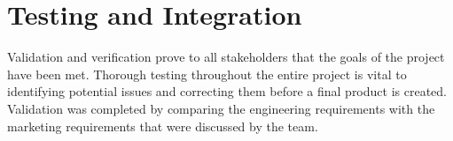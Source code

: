 \newcommand{\testheader}{\textrotate{\textbf{Step}} & \textbf{Action} & \textbf{Expected Result} & \textrotate{\textbf{Pass}} & \textrotate{\textbf{Fail}} & \textrotate{\textbf{N/A}} & \textbf{Comments} \\ \hline}
\newcommand{\testinfo}[2]{\multicolumn{2}{|r|}{\textbf{Test Case Name:}} & \multicolumn{5}{m{11cm}|}{#1} \\ \hline \multicolumn{2}{|r|}{\textbf{Description:}} & \multicolumn{5}{m{11cm}|}{#2} \\ \hline}
\newcommand{\testerinfo}{\multicolumn{2}{|r|}{\textbf{Name of Tester:}} & & \multicolumn{3}{l|}{\textbf{Date:}} & \\ \hline \multicolumn{2}{|r|}{\textbf{HW/SW Version:}} & & \multicolumn{3}{l|}{\textbf{Time:}} & \\ \hline}
\newcommand{\testsetup}[1]{\multicolumn{2}{|r|}{\textbf{Setup:}} & \multicolumn{5}{m{11cm}|}{#1} \\ \hline}
\newcommand{\testtabular}[3]{\begin{tabular}{|m{.25cm}|m{4cm}|m{5cm}|m{.25cm}|m{.25cm}|m{.25cm}|m{3cm}|}\hline\testinfo{#1}{#2}\testerinfo\testsetup{#3}\testheader}

\chapter{Testing and Integration}
Validation and verification prove to all stakeholders that the goals of the project have been met.
Thorough testing throughout the entire project is vital to identifying potential issues and correcting them before a final product is created. 
Validation was completed by comparing the engineering requirements with the marketing requirements that were discussed by the team. 

